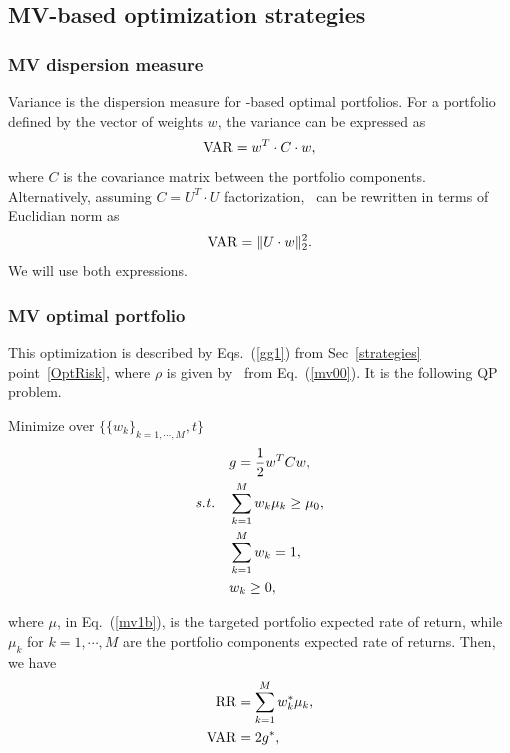 
\subsection{MV-based optimization strategies}\label{S:MV}

\subsubsection{MV dispersion measure}
Variance is the dispersion measure for \MV-based optimal portfolios.
For a portfolio defined by the vector of weights $w$, the variance can
be expressed as
\begin{equation}
    \VAR = w^T \cdot C \cdot w,
    \label{mv00}
\end{equation}
where $C$ is the covariance matrix between the portfolio components.
Alternatively, assuming $C=U^T\cdot U$ factorization, \VAR\ can be rewritten in terms of Euclidian norm as
\begin{equation}
    \VAR = \|U \cdot w\|_2^2.
    \label{mv0}
\end{equation}
We will use both expressions.

\BackToContents

\subsubsection{MV optimal portfolio}
This optimization is described by Eqs.~(\ref{gg1}) from Sec~\ref{strategies} point~\ref{OptRisk},
where $\rho$ is given by \VAR\ from Eq.~(\ref{mv00}).
It is the following QP problem.

\bigskip
\noindent Minimize over $\{ \{w_k\}_{k=1,\cdots,M}, t\}$
\begin{subequations}\label{mv1}
\begin{align}
    & g = \frac{1}{2} w^T C w, \label{mv1a} \\
    \st & \sum_{k=1}^M w_k \mu_k \geq \mu_0, \label{mv1b} \\
        & \sum_{k=1}^M w_k = 1, \label{mv1c} \\
        & w_k \geq 0, \label{mv1d}
\end{align}
\end{subequations}

\noindent where $\mu$, in Eq.~(\ref{mv1b}),
is the targeted portfolio expected rate of return, while $\mu_k$ for $k=1,\cdots,M$
are the portfolio components expected rate of returns.
Then, we have
\begin{subequations}\label{mv2}
\begin{align}
    \RR &= \sum_{k=1}^M w_k^* \mu_k, \label{mv2a} \\
    \VAR &= 2 g^*, \label{mv2b}
\end{align}
\end{subequations}

